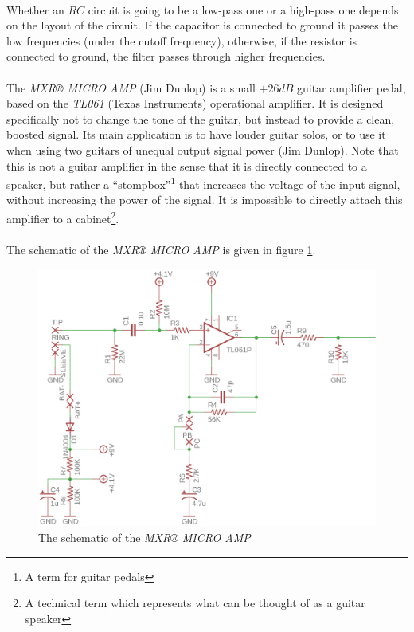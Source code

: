 \documentclass[a4paper, 12pt]{article}
\begin{document}
\paragraph*{}
Whether an $RC$ circuit is going to be a low-pass one or a high-pass one 
depends on the layout of the circuit. If the capacitor is connected to ground 
it passes the low frequencies (under the cutoff frequency), otherwise, if the 
resistor is connected to ground, the filter passes through higher frequencies.

\paragraph*{}
The \textit{MXR® MICRO AMP} (Jim Dunlop) is a small  $+26\si{dB}$ guitar 
amplifier pedal, based on the \textit{TL061} (Texas Instruments) operational 
amplifier. It is designed specifically not to change the tone of the guitar, 
but instead to provide a clean, boosted signal. Its main application is to 
have louder guitar solos, or to use it when using two guitars of unequal 
output signal power (Jim Dunlop). Note that this is not a guitar amplifier in 
the sense that it is directly connected to a speaker, but rather a 
``stompbox''\footnote{A term for guitar pedals} that increases the voltage of 
the input signal, without increasing the power of the signal. It is impossible 
to directly attach this amplifier to a cabinet\footnote{A technical term which 
represents what can be thought of as a guitar speaker}.

\paragraph*{}
The schematic of the \textit{MXR® MICRO AMP} is given in figure 
\ref{fig:mxr_schematic}.
\begin{figure}[ht] 
	\centering
	\includegraphics{img/mxr-schematic}
	\caption{The schematic of the \textit{MXR® MICRO AMP}}
	\label{fig:mxr_schematic}
\end{figure}
\end{document}
